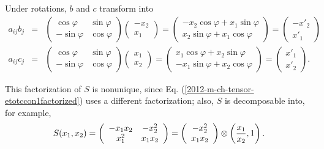 {Under rotations, $b$ and $c$  transform into
\begin{eqnarray*}
a_{ij}b_j&=&
  \left(
    \begin{array}{cc}
      \cos \varphi  & \sin \varphi \\
      -\sin \varphi & \cos \varphi
    \end{array}
  \right)
  \left(
    \begin{array}{c}
      -x_2\\
       x_1
    \end{array}
  \right)
=
  \left(
    \begin{array}{c}
      -x_2\cos \varphi +x_1 \sin \varphi \\
      x_2\sin \varphi +x_1 \cos \varphi
    \end{array}
  \right)
=
  \left(
    \begin{array}{c}
      -x'_2 \\
      x'_1
    \end{array}
  \right)    \\
 a_{ij}c_j&=&
  \left(
    \begin{array}{cc}
      \cos \varphi  & \sin \varphi \\
      -\sin \varphi & \cos \varphi
    \end{array}
  \right)
  \left(
    \begin{array}{c}
      x_1\\
       x_2
    \end{array}
  \right)
=
  \left(
    \begin{array}{c}
      x_1\cos \varphi +x_2 \sin \varphi \\
      -x_1\sin \varphi +x_2 \cos \varphi
    \end{array}
  \right)
=
  \left(
    \begin{array}{c}
      x'_1    \\
      x'_2
    \end{array}
  \right) .
\end{eqnarray*}

This factorization of $S$ is nonunique, since
Eq.
(\ref{2012-m-ch-tensor-etotccon1factorized})
uses a different factorization; also, $S$ is decomposable into, for example,
$$S(x_1,x_2)=
  \left(
    \begin{array}{cc}
      -x_1x_2 & -x_2^2 \\
      x_1^2   & x_1x_2
    \end{array}
  \right)     =
  \left(
    \begin{array}{cc}
      -x_2^2 \\
      x_1 x_2
    \end{array}
  \right)
\otimes \left({x_1\over x_2},1\right).
$$



\eexample
}



